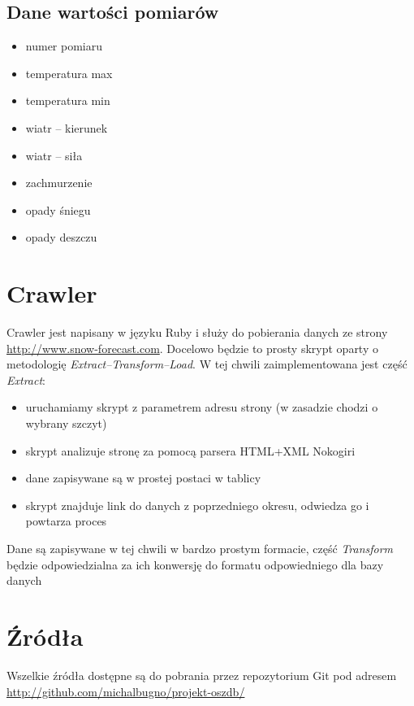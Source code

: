 \documentclass[12pt]{article}
\begin{document}
\subsection{Dane wartości pomiarów}
  \begin{itemize}
  \item numer pomiaru
  \item temperatura max
  \item temperatura min
  \item wiatr -- kierunek
  \item wiatr -- siła
  \item zachmurzenie
  \item opady śniegu
  \item opady deszczu
\end{itemize}

\section{Crawler}
Crawler jest napisany w języku Ruby i służy do pobierania danych ze strony
\\\url{http://www.snow-forecast.com}.
Docelowo będzie to prosty skrypt oparty o metodologię \emph{Extract--Transform--Load}. W tej chwili zaimplementowana
jest część \emph{Extract}:
\begin{itemize}
\item uruchamiamy skrypt z parametrem adresu strony (w zasadzie chodzi o wybrany szczyt)
\item skrypt analizuje stronę za pomocą parsera HTML+XML Nokogiri
\item dane zapisywane są w prostej postaci w tablicy
\item skrypt znajduje link do danych z poprzedniego okresu, odwiedza go i powtarza proces
\end{itemize}

Dane są zapisywane w tej chwili w bardzo prostym formacie, część \emph{Transform} będzie odpowiedzialna
za ich konwersję do formatu odpowiedniego dla bazy danych

\section{Źródła}
Wszelkie źródła dostępne są do pobrania przez repozytorium Git pod adresem
\\
\url{http://github.com/michalbugno/projekt-oszdb/}
\end{document}
